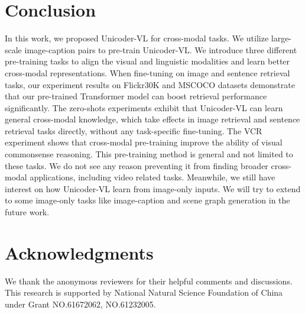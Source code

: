 \documentclass[letterpaper]{article} \usepackage{aaai20}  \usepackage{times}  \usepackage{helvet} \usepackage{courier}  \usepackage[hyphens]{url}  \usepackage{graphicx} \urlstyle{rm} \def\UrlFont{\rm}  \usepackage{graphicx}  \frenchspacing  \setlength{\pdfpagewidth}{8.5in}  \setlength{\pdfpageheight}{11in}  \usepackage{amssymb}
\begin{document}
\begin{table}[!htbp]
\centering
{}
 \caption{Ablation study of the Flickr30k retrieval results of Unicoder-VL with respect to the pre-training dataset size. The number in parentheses 
 is the number of image-text pairs we used in pre-training. 0 means without pre-training.}
\label{Datasetsize}
\end{table}









\section{Conclusion}

\noindent In this work, we proposed Unicoder-VL for cross-modal tasks. We utilize large-scale image-caption pairs to pre-train Unicoder-VL. We introduce three different pre-training tasks to align the visual and linguistic modalities and learn better cross-modal representations. When fine-tuning on image and sentence retrieval tasks, our experiment results on Flickr30K and MSCOCO datasets demonstrate that our pre-trained Transformer model can boost retrieval performance significantly. The zero-shots experiments exhibit that Unicoder-VL can learn general cross-modal knowledge, which take effects in image retrieval and sentence retrieval tasks directly, without any task-specific fine-tuning. The VCR experiment shows that cross-modal pre-training improve the ability of visual commonsense reasoning. This pre-training method is general and not limited to these tasks. We do not see any reason preventing it from finding broader cross-modal applications, including video related tasks. Meanwhile, we still have interest on how Unicoder-VL learn from image-only inputs. We will try to extend to some image-only tasks like image-caption and scene graph generation in the future work.

\section{Acknowledgments}
We thank the anonymous reviewers for their helpful comments and discussions. This research is supported by National Natural Science Foundation of China under Grant NO.61672062, NO.61232005.


\bigskip



\end{document}

